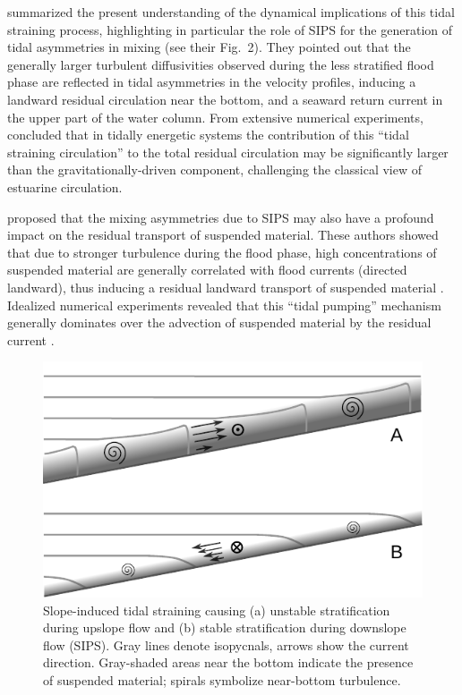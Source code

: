 \cite{MacCreadyGeyer2014a} summarized the present understanding of the
dynamical implications of this tidal straining process, highlighting
in particular the role of SIPS for the generation of tidal asymmetries
in mixing (see their Fig.\ 2). They pointed out that the generally
larger turbulent diffusivities observed during the less stratified
flood phase are reflected in tidal asymmetries in the velocity
profiles, inducing a landward residual circulation near the bottom,
and a seaward return current in the upper part of the water
column. From extensive numerical experiments,
\cite{BurchardHetland2010a} concluded that in tidally energetic systems
the contribution of this ``tidal straining circulation'' to the total
residual circulation may be significantly larger than the
gravitationally-driven component, challenging the classical view of
estuarine circulation.

\cite{JayMusiak94a} proposed that the mixing asymmetries due to SIPS
may also have a profound impact on the residual transport of suspended
material. These authors showed that due to stronger turbulence during
the flood phase, high concentrations of suspended material are
generally correlated with flood currents (directed landward), thus
inducing a residual landward transport of suspended material
\citep{Unclesetal85a,JayMusiak94a,ScullyFriedrichs2007a}. Idealized
numerical experiments revealed that this ``tidal pumping'' mechanism
generally dominates over the advection of suspended material by the
residual current \citep{Burchardetal2013a}. 

\begin{figure}
  \noindent\includegraphics[width=30pc]{sketch.pdf}
  \caption{Slope-induced tidal straining causing (a) unstable
    stratification during upslope flow and (b) stable stratification
    during downslope flow (SIPS). Gray lines denote isopycnals, arrows
    show the current direction. Gray-shaded areas near the bottom
    indicate the presence of suspended material; spirals symbolize
    near-bottom turbulence.}
  \label{sketch}
\end{figure}

